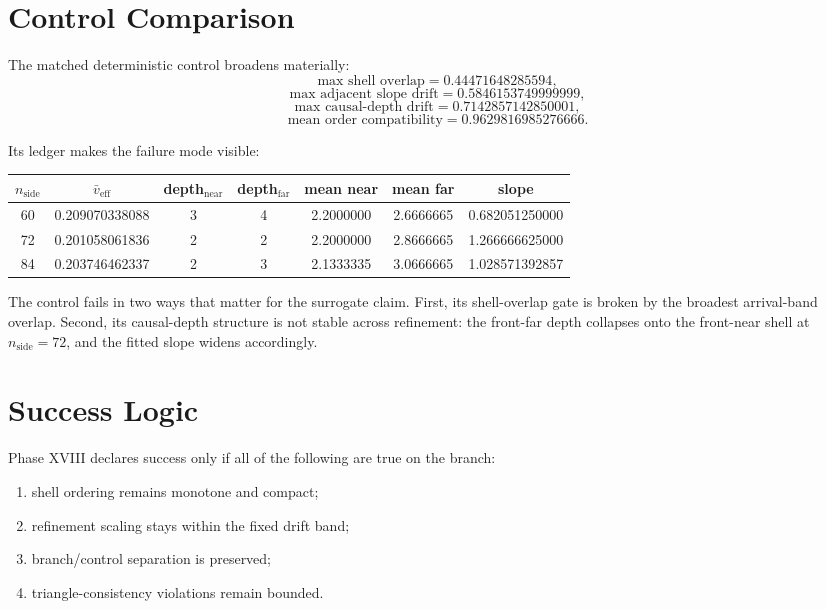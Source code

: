 \documentclass[11pt]{article}
\begin{document}
\section{Control Comparison}

The matched deterministic control broadens materially:
\[
\text{max shell overlap}=0.44471648285594,
\]
\[
\text{max adjacent slope drift}=0.5846153749999999,
\]
\[
\text{max causal-depth drift}=0.7142857142850001,
\]
\[
\text{mean order compatibility}=0.9629816985276666.
\]

Its ledger makes the failure mode visible:
\begin{center}
\begin{tabular}{ccccccc}
\toprule
$n_{\mathrm{side}}$ & $\bar v_{\mathrm{eff}}$ & depth$_{\mathrm{near}}$ & depth$_{\mathrm{far}}$ & mean near & mean far & slope \\
\midrule
60 & 0.209070338088 & 3 & 4 & 2.2000000 & 2.6666665 & 0.682051250000 \\
72 & 0.201058061836 & 2 & 2 & 2.2000000 & 2.8666665 & 1.266666625000 \\
84 & 0.203746462337 & 2 & 3 & 2.1333335 & 3.0666665 & 1.028571392857 \\
\bottomrule
\end{tabular}
\end{center}

The control fails in two ways that matter for the surrogate claim. First, its shell-overlap gate is broken by the broadest arrival-band overlap. Second, its causal-depth structure is not stable across refinement: the front-far depth collapses onto the front-near shell at $n_{\mathrm{side}}=72$, and the fitted slope widens accordingly.

\section{Success Logic}

Phase XVIII declares success only if all of the following are true on the branch:
\begin{enumerate}
\item shell ordering remains monotone and compact;
\item refinement scaling stays within the fixed drift band;
\item branch/control separation is preserved;
\item triangle-consistency violations remain bounded.
\end{enumerate}
\end{document}
